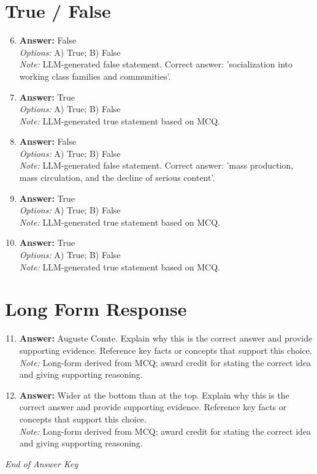 \documentclass[12pt]{article}
\begin{document}
\section*{True / False}
\begin{enumerate}[label=\arabic*.]
\setcounter{enumi}{5}
\item \textbf{Answer:} False
\\ \textit{Options:} A) True; B) False
\\ \textit{Note:} LLM-generated false statement. Correct answer: 'socialization into working class families and communities'.
\item \textbf{Answer:} True
\\ \textit{Options:} A) True; B) False
\\ \textit{Note:} LLM-generated true statement based on MCQ.
\item \textbf{Answer:} False
\\ \textit{Options:} A) True; B) False
\\ \textit{Note:} LLM-generated false statement. Correct answer: 'mass production, mass circulation, and the decline of serious content'.
\item \textbf{Answer:} True
\\ \textit{Options:} A) True; B) False
\\ \textit{Note:} LLM-generated true statement based on MCQ.
\item \textbf{Answer:} True
\\ \textit{Options:} A) True; B) False
\\ \textit{Note:} LLM-generated true statement based on MCQ.
\end{enumerate}

\section*{Long Form Response}
\begin{enumerate}[label=\arabic*.]
\setcounter{enumi}{10}
\item \textbf{Answer:} Auguste Comte. Explain why this is the correct answer and provide supporting evidence. Reference key facts or concepts that support this choice.
\\ \textit{Note:} Long-form derived from MCQ; award credit for stating the correct idea and giving supporting reasoning.
\item \textbf{Answer:} Wider at the bottom than at the top. Explain why this is the correct answer and provide supporting evidence. Reference key facts or concepts that support this choice.
\\ \textit{Note:} Long-form derived from MCQ; award credit for stating the correct idea and giving supporting reasoning.
\end{enumerate}

\vfill
\noindent\textit{End of Answer Key}
\end{document}
